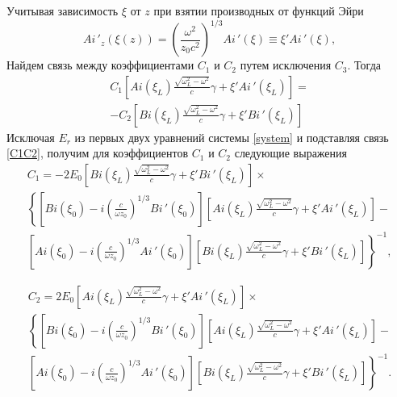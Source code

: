 \documentclass[12pt,a4paper]{article}
\numberwithin{equation}{section}
\begin{document}
Учитывая зависимость $\xi$ от $z$ при взятии производных от функций Эйри
\begin{equation}
    \label{}
    Ai\,'_z\left(\xi\left(z\right)\right) = \left(\frac{\omega^2}{z_0 c^2}\right)^{1/3}Ai\,'\left(\xi\right) \equiv \xi' Ai\,'\left(\xi\right),
\end{equation}
Найдем связь между коэффициентами $C_1$ и $C_2$ путем исключения $C_3$. Тогда
\begin{equation}
      \label{C1C2}
      \begin{array}{lcl}
    C_1\left[Ai\left(\xi_L\right)\frac{\sqrt{\omega_L^2-\omega^2}}{c}\gamma+\xi'Ai\,'\left(\xi_L\right)\right] = \\ -C_2\left[Bi\left(\xi_L\right)\frac{\sqrt{\omega_L^2-\omega^2}}{c}\gamma+\xi'Bi\,'\left(\xi_L\right)\right]
\end{array}
\end{equation}
Исключая $E_r$ из первых двух уравнений системы \eqref{system} и подставляя связь \eqref{C1C2}, получим для коэффициентов $C_1$ и $C_2$ следующие выражения
\begin{equation}
    \label{C1_common}
    \begin{array}{lcl}
         C_1 = -2E_0\left[Bi\left(\xi_L\right)\frac{\sqrt{\omega_L^2-\omega^2}}{c}\gamma+\xi'Bi\,'\left(\xi_L\right)\right]\times \\
       \left\{\left[Bi\left(\xi_0\right)-i\left(\frac{c}{\omega z_0}\right)^{1/3}Bi\,'\left(\xi_0\right)\right]\left[Ai\left(\xi_L\right)\frac{\sqrt{\omega_L^2-\omega^2}}{c}\gamma+\xi'Ai\,'\left(\xi_L\right)\right] - \right.\\ 
       \left.\left[Ai\left(\xi_0\right)-i\left(\frac{c}{\omega z_0}\right)^{1/3}Ai\,'\left(\xi_0\right)\right]\left[Bi\left(\xi_L\right)\frac{\sqrt{\omega_L^2-\omega^2}}{c}\gamma+\xi'Bi\,'\left(\xi_L\right)\right]\right\}^{-1},
    \end{array}
\end{equation}

\begin{equation}
    \label{C2_common}
    \begin{array}{lcl}
         C_2 = 2E_0\left[Ai\left(\xi_L\right)\frac{\sqrt{\omega_L^2-\omega^2}}{c}\gamma+\xi'Ai\,'\left(\xi_L\right)\right]\times \\
       \left\{\left[Bi\left(\xi_0\right)-i\left(\frac{c}{\omega z_0}\right)^{1/3}Bi\,'\left(\xi_0\right)\right]\left[Ai\left(\xi_L\right)\frac{\sqrt{\omega_L^2-\omega^2}}{c}\gamma+\xi'Ai\,'\left(\xi_L\right)\right] - \right.\\ 
       \left.\left[Ai\left(\xi_0\right)-i\left(\frac{c}{\omega z_0}\right)^{1/3}Ai\,'\left(\xi_0\right)\right]\left[Bi\left(\xi_L\right)\frac{\sqrt{\omega_L^2-\omega^2}}{c}\gamma+\xi'Bi\,'\left(\xi_L\right)\right]\right\}^{-1}.
    \end{array}
\end{equation}
\end{document}
